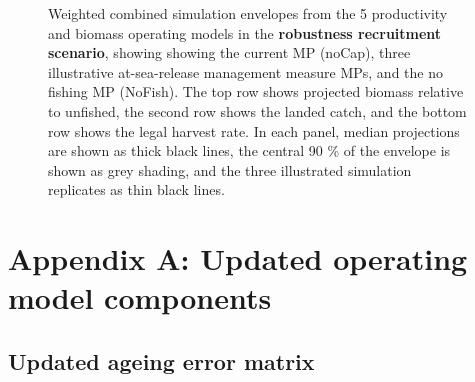 \documentclass[11pt]{book}
\begin{document}
\begin{landscape}
\begin{figure}[htb]
{\centering {} 

}

\caption{Weighted combined simulation envelopes from the 5 productivity and biomass operating models in the \textbf{robustness recruitment scenario}, showing showing the current MP (noCap), three illustrative at-sea-release management measure MPs, and the no fishing MP (NoFish). The top row shows projected biomass relative to unfished, the second row shows the landed catch, and the bottom row shows the legal harvest rate. In each panel, median projections are shown as thick black lines, the central 90 \% of the envelope is shown as grey shading, and the three illustrated simulation replicates as thin black lines.}\label{fig:unnamed-chunk-26}
\end{figure}
\end{landscape}
\hypertarget{appendix-appendices}{%
\appendix}


\hypertarget{appendix-a-updated-operating-model-components}{%
\section{Appendix A: Updated operating model components}\label{appendix-a-updated-operating-model-components}}

\setcounter{table}{0}\setcounter{figure}{0}

\hypertarget{updated-ageing-error-matrix}{%
\subsection{Updated ageing error matrix}\label{updated-ageing-error-matrix}}
\end{document}
